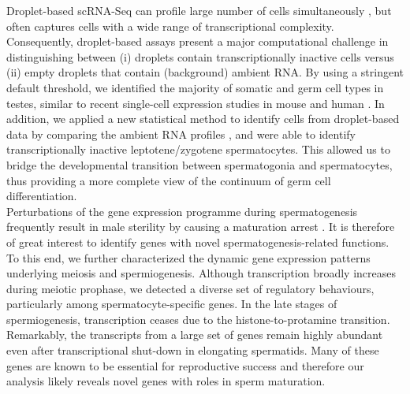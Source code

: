 Droplet-based scRNA-Seq can profile large number of cells simultaneously \citep{Klein2015, Macosko2015, Zheng2017}, but often captures cells with a wide range of transcriptional complexity. Consequently, droplet-based assays present a major computational challenge in distinguishing between (i) droplets contain transcriptionally inactive cells versus (ii) empty droplets that contain (background) ambient RNA. By using a stringent default threshold, we identified the majority of somatic and germ cell types in testes, similar to recent single-cell expression studies in mouse and human \citep{Lukassen2018, Xia2018}. In addition, we applied a new statistical method to identify cells from droplet-based data by comparing the ambient RNA profiles \citep{Lun2018}, and were able to identify transcriptionally inactive leptotene/zygotene spermatocytes. This allowed us to bridge the developmental transition between spermatogonia and spermatocytes, thus providing a more complete view of the continuum of germ cell differentiation.\\

Perturbations of the gene expression programme during spermatogenesis frequently result in male sterility by causing a maturation arrest \citep{Cooke2002}. It is therefore of great interest to identify genes with novel spermatogenesis-related functions. To this end, we further characterized the dynamic gene expression patterns underlying meiosis and spermiogenesis. Although transcription broadly increases during meiotic prophase, we detected a diverse set of regulatory behaviours, particularly among spermatocyte-specific genes. In the late stages of spermiogenesis, transcription ceases due to the histone-to-protamine transition. Remarkably, the transcripts from a large set of genes remain highly abundant even after transcriptional shut-down in elongating spermatids. Many of these genes are known to be essential for reproductive success and therefore our analysis likely reveals novel genes with roles in sperm maturation.\\

